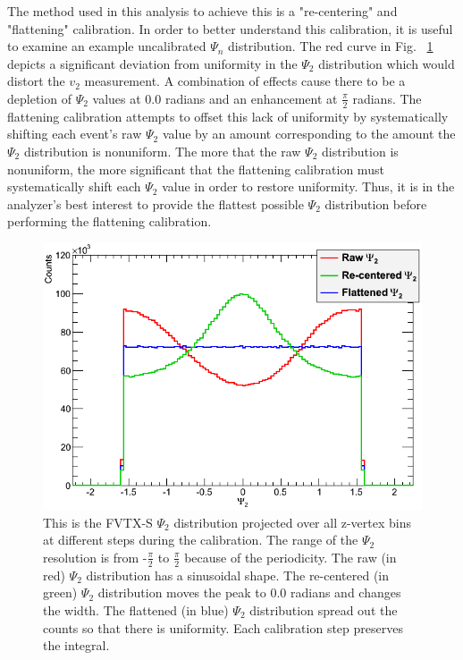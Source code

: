 The method used in this analysis to achieve this is a "re-centering" and "flattening" calibration. In order to better understand this calibration, it is useful to examine an example uncalibrated $\Psi_n$ distribution.
The red curve in Fig. ~\ref{fig:calibrated_psi} depicts a significant deviation from uniformity in the $\Psi_2$ distribution which would distort the $v_2$ measurement. 
A combination of effects cause there to be a depletion of $\Psi_2$ values at 0.0 radians and an enhancement at $\frac{\pi}{2}$ radians. The flattening calibration attempts to offset this 
lack of uniformity by systematically shifting each event's raw $\Psi_2$ value by an amount corresponding to the amount the $\Psi_2$ distribution is nonuniform. The more that the raw $\Psi_2$
distribution is nonuniform, the more significant that the flattening calibration must systematically shift each $\Psi_2$ value in order to restore uniformity. Thus, it is in the analyzer's best interest
to provide the flattest possible $\Psi_2$ distribution before performing the flattening calibration.
\begin{figure}[!h]
\begin{center}
\includegraphics[width=0.65\linewidth]{figs/flattened_example.png}
\caption{This is the FVTX-S $\Psi_2$ distribution projected over all z-vertex bins at different steps during the calibration. The range of the $\Psi_2$ resolution is from -$\frac{\pi}{2}$ to $\frac{\pi}{2}$ because of the periodicity. 
The raw (in red) $\Psi_2$ distribution has a sinusoidal shape. The re-centered (in green) $\Psi_2$ distribution moves the peak to 0.0 radians and changes the width. The flattened (in blue) 
$\Psi_2$ distribution spread out the counts so that there is uniformity. Each calibration step preserves the integral.}
\end{center}
\label{fig:calibrated_psi}
\end{figure}

